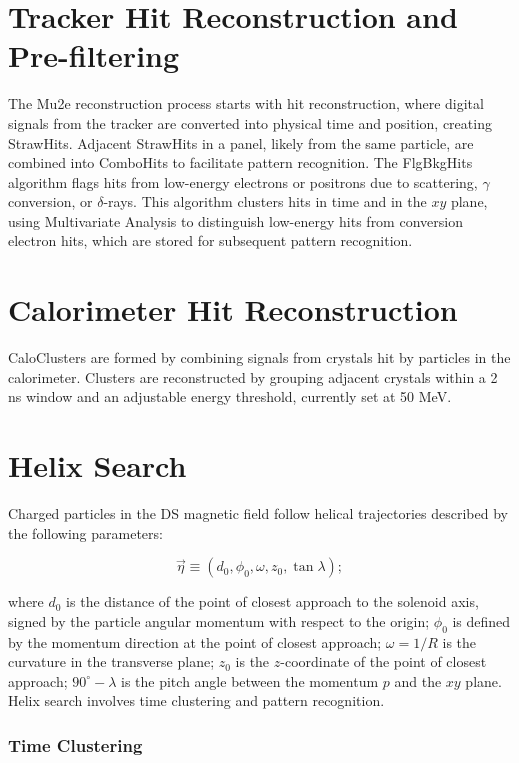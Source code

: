 \section{Tracker Hit Reconstruction and Pre-filtering}

The Mu2e reconstruction process starts with hit reconstruction, where digital signals from the 
tracker are converted into physical time and position, creating StrawHits. Adjacent StrawHits in 
a panel, likely from the same particle, are combined into ComboHits to facilitate pattern recognition. 
The FlgBkgHits algorithm flags hits from low-energy electrons or positrons due to scattering, $\gamma$ 
conversion, or $\delta$-rays. This algorithm clusters hits in time and in the $xy$ plane, using 
Multivariate Analysis to distinguish low-energy hits from conversion electron hits, which are stored for subsequent pattern recognition.

\section{Calorimeter Hit Reconstruction}

CaloClusters are formed by combining signals from crystals hit by particles 
in the calorimeter. Clusters are reconstructed by grouping adjacent crystals 
within a 2 ns window and an adjustable energy threshold, currently set at 50 MeV.

\section{Helix Search}

Charged particles in the DS magnetic field follow helical trajectories described 
by the following parameters:

\[
\vec{\eta} \equiv (d_0, \phi_0, \omega, z_0, \tan \lambda);
\]

where $d_0$ is the distance of the point of closest approach to the solenoid axis, 
signed by the particle angular momentum with respect to the origin; $\phi_0$ is 
defined by the momentum direction at the point of closest approach; $\omega = 1/R$ 
is the curvature in the transverse plane; $z_0$ is the $z$-coordinate of the point of 
closest approach; $90^\circ - \lambda$ is the pitch angle between the momentum $p$ and 
the $xy$ plane. Helix search involves time clustering and pattern recognition.

\subsubsection{Time Clustering}

